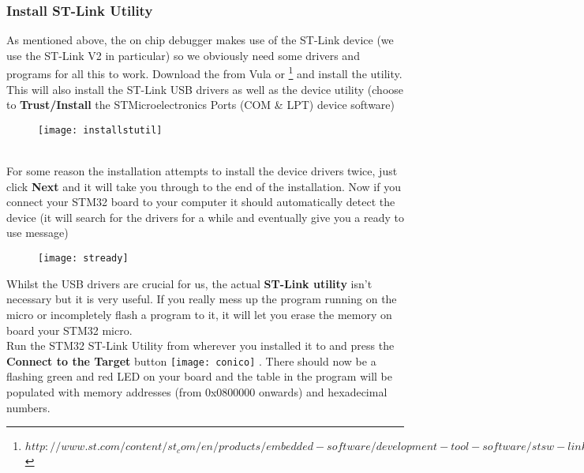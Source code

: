 \subsubsection{Install ST-Link Utility}
\label{subsec:stlink}
As mentioned above, the on chip debugger makes use of the ST-Link device (we use the ST-Link V2 in particular) so we obviously need some drivers and programs for all this to work. 
Download the \href{https://vula.uct.ac.za/x/8LNN3V}{\color{Blue}\underline{}} from Vula or \href{http://www.st.com/content/st_com/en/products/embedded-software/development-tool-software/stsw-link004.html}{\color{Blue}\underline{}}\footnote{$http://www.st.com/content/st_com/en/products/embedded-software/development-tool-software/stsw-link004.html$} and install the utility. This will also install the ST-Link USB drivers as well as the device utility (choose to \textbf{\color{Purple} Trust/Install} the STMicroelectronics Ports (COM \& LPT) device software)
\\
\begin{figure}[htbp]
\centering
\texttt{[image: installstutil]}
\end{figure}
\\
For some reason the installation attempts to install the device drivers twice, just click \textbf{\color{Purple} Next} and it will take you through to the end of the installation. Now if you connect your STM32 board to your computer it should automatically detect the device (it will search for the drivers for a while and eventually give you a ready to use message)
\\
\begin{figure}[hbtp]
\centering
\texttt{[image: stready]}
\end{figure}
\par
Whilst the USB drivers are crucial for us, the actual \textbf{\color{Brown} ST-Link utility} isn't necessary but it is very useful. If you really mess up the program running on the micro or incompletely flash a program to it, it will let you erase the memory on board your STM32 micro.
\\
Run the STM32 ST-Link Utility from wherever you installed it to and press the \textbf{\color{Purple} Connect to the Target} button 
\texttt{[image: conico]}
. There should now be a flashing green and red LED on your board and the table in the program will be populated with memory addresses (from 0x0800000 onwards) and hexadecimal numbers.
\par

